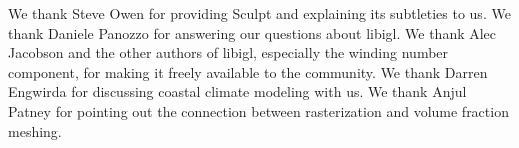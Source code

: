 {
We thank Steve Owen for providing Sculpt and explaining its subtleties to us. 
We thank Daniele Panozzo for answering our questions about libigl.
We thank Alec Jacobson and the other authors of libigl, especially the winding number component, for making it freely available to the community. 
We thank Darren Engwirda for discussing coastal climate modeling with us.
We thank Anjul Patney for pointing out the connection between rasterization and volume fraction meshing.\par
}
